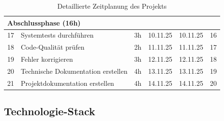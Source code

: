 \begin{table}[H]
\begin{tabularx}{\textwidth}{|p{0.7cm}|X|p{1.2cm}|p{1.7cm}|p{1.7cm}|p{1.1cm}|}
\multicolumn{6}{|l|}{\cellcolor{EDAGDunkelgrau!10}\textbf{Abschlussphase (16h)}} \\
\hline
17 & Systemtests durchführen & 3h & 10.11.25 & 10.11.25 & 16 \\
18 & Code-Qualität prüfen & 2h & 11.11.25 & 11.11.25 & 17 \\
19 & Fehler korrigieren & 3h & 12.11.25 & 12.11.25 & 18 \\
20 & Technische Dokumentation erstellen & 4h & 13.11.25 & 13.11.25 & 19 \\
21 & Projektdokumentation erstellen & 4h & 14.11.25 & 14.11.25 & 20 \\
\hline
\end{tabularx}
\caption{Detaillierte Zeitplanung des Projekts}
\label{tab:zeitplanung_detail}
\end{table}

\subsection{Technologie-Stack}

